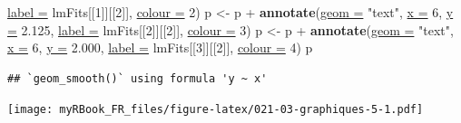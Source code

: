 \documentclass[twoside,symmetric]{book}
\newenvironment{Shaded}{}{}
\newcommand{\DataTypeTok}[1]{\underline{#1}}
\newcommand{\DecValTok}[1]{#1}
\newcommand{\FloatTok}[1]{#1}
\newcommand{\KeywordTok}[1]{\textbf{#1}}
\newcommand{\NormalTok}[1]{#1}
\newcommand{\OperatorTok}[1]{#1}
\newcommand{\StringTok}[1]{#1}
\begin{document}
\begin{Shaded}
\begin{Highlighting}[]
  \DataTypeTok{label =}\NormalTok{ lmFits[[}\DecValTok{1}\NormalTok{]][[}\DecValTok{2}\NormalTok{]], }\DataTypeTok{colour =} \DecValTok{2}\NormalTok{)}
\NormalTok{p <-}\StringTok{ }\NormalTok{p }\OperatorTok{+}\StringTok{ }\KeywordTok{annotate}\NormalTok{(}\DataTypeTok{geom =} \StringTok{"text"}\NormalTok{, }\DataTypeTok{x =} \DecValTok{6}\NormalTok{, }\DataTypeTok{y =} \FloatTok{2.125}\NormalTok{, }
  \DataTypeTok{label =}\NormalTok{ lmFits[[}\DecValTok{2}\NormalTok{]][[}\DecValTok{2}\NormalTok{]], }\DataTypeTok{colour =} \DecValTok{3}\NormalTok{)}
\NormalTok{p <-}\StringTok{ }\NormalTok{p }\OperatorTok{+}\StringTok{ }\KeywordTok{annotate}\NormalTok{(}\DataTypeTok{geom =} \StringTok{"text"}\NormalTok{, }\DataTypeTok{x =} \DecValTok{6}\NormalTok{, }\DataTypeTok{y =} \FloatTok{2.000}\NormalTok{, }
  \DataTypeTok{label =}\NormalTok{ lmFits[[}\DecValTok{3}\NormalTok{]][[}\DecValTok{2}\NormalTok{]], }\DataTypeTok{colour =} \DecValTok{4}\NormalTok{)}
\NormalTok{p}
\end{Highlighting}
\end{Shaded}

\begin{verbatim}
## `geom_smooth()` using formula 'y ~ x'
\end{verbatim}

\texttt{[image: myRBook\_FR\_files/figure-latex/021-03-graphiques-5-1.pdf]}
\end{document}
